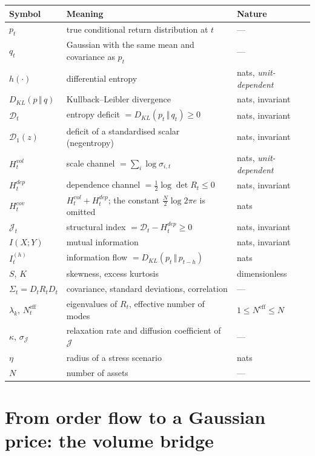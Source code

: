 \documentclass[11pt]{article}
\theoremstyle{definition}
\theoremstyle{remark}
\newcommand{\JJ}{\mathcal{J}}
\newcommand{\DD}{\mathcal{D}}
\newcommand{\Dun}{\mathcal{D}_1}
\newcommand{\KL}[2]{D_{KL}\!\left(#1\,\Vert\,#2\right)}
\begin{document}
\begin{center}
\small
\begin{tabular}{@{}lll@{}}
\toprule
Symbol & Meaning & Nature \\
\midrule
$p_t$ & true conditional return distribution at $t$ & --- \\
$q_t$ & Gaussian with the same mean and covariance as $p_t$ & --- \\
$h(\cdot)$ & differential entropy & nats, \emph{unit-dependent} \\
$\KL{p}{q}$ & Kullback--Leibler divergence & nats, invariant \\
$\DD_t$ & entropy deficit $=\KL{p_t}{q_t}\ge0$ & nats, invariant \\
$\Dun(z)$ & deficit of a standardised scalar (negentropy) & nats, invariant \\
$H^{vol}_t$ & scale channel $=\sum_i\log\sigma_{i,t}$ & nats, \emph{unit-dependent} \\
$H^{dep}_t$ & dependence channel $=\tfrac12\log\det R_t\le0$ & nats, invariant \\
$H^{cov}_t$ & $H^{vol}_t+H^{dep}_t$; the constant $\tfrac N2\log2\pi e$ is omitted & nats \\
$\JJ_t$ & structural index $=\DD_t-H^{dep}_t\ge0$ & nats, invariant \\
$I(X;Y)$ & mutual information & nats, invariant \\
$I^{(h)}_t$ & information flow $=\KL{p_t}{p_{t-h}}$ & nats \\
$S$, $K$ & skewness, excess kurtosis & dimensionless \\
$\Sigma_t=D_tR_tD_t$ & covariance, standard deviations, correlation & --- \\
$\lambda_k$, $N^{\text{eff}}_t$ & eigenvalues of $R_t$, effective number of modes & $1\le N^{\text{eff}}\le N$ \\
$\kappa$, $\sigma_\JJ$ & relaxation rate and diffusion coefficient of $\JJ$ & --- \\
$\eta$ & radius of a stress scenario & nats \\
$N$ & number of assets & --- \\
\bottomrule
\end{tabular}
\end{center}

\section{From order flow to a Gaussian price: the volume bridge}
\label{sec:bridge}
\end{document}
